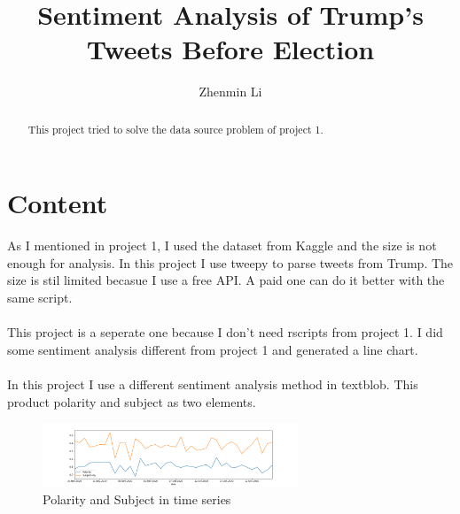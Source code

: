 \documentclass{article}
\begin{document}
\title{Sentiment Analysis of Trump's Tweets Before Election}
\author{Zhenmin Li}

\maketitle

\begin{abstract}
This project tried to solve the data source problem of project 1.
\end{abstract}

\section{Content}

As I mentioned in project 1, I used the dataset from Kaggle and the size is not enough for analysis. In this project I use tweepy to parse tweets from Trump. The size is stil limited becasue I use a free API. A paid one can do it better with the same script.
\\ \hspace*{\fill} \\ 
This project is a seperate one because I don't need rscripts from project 1. I did some sentiment analysis different from project 1 and generated a line chart.
\\ \hspace*{\fill} \\ 
In this project I use a different sentiment analysis method in textblob. This product polarity and subject as two elements.

\begin{figure}[h]
    \centering
    \includegraphics[width=3.0in]{image/sentiment.png}
    \caption{Polarity and Subject in time series}
    \label{top20}
\end{figure}
\end{document}
